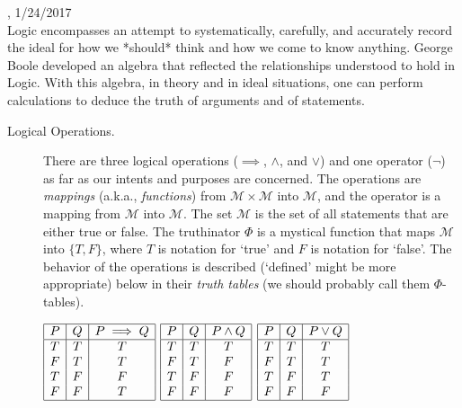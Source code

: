 \documentclass[10pt, AMS Euler]{article}
\begin{document}
, 1/24/2017\\

 Logic encompasses an attempt to systematically, carefully, and accurately record the ideal for 
how we *should* think and how we come to know anything.  George Boole developed an algebra that reflected the 
relationships understood to hold in Logic.  With this algebra, in theory and in ideal situations, one can perform 
calculations to deduce the truth of arguments and of statements.\\




\begin{description}

\item[Logical Operations.]  There are three logical operations ($\implies$, $\wedge$, and $\vee$) and one operator ($\neg$) 
as far as our intents and purposes are concerned.  The operations are \emph{mappings} (a.k.a., \emph{functions}) 
from $\mathcal{M} \times \mathcal{M}$ into $\mathcal{M}$, and the operator is a mapping from $\mathcal{M}$ into $\mathcal{M}$.
The set $\mathcal{M}$ is the set of all statements that are either true or false.  The truthinator $\Phi$ is a mystical function 
that maps $\mathcal{M}$ into $\{T,F\}$, where $T$ is notation for `true' and $F$ is notation for `false'.  
The behavior of the operations is described (`defined' might be more appropriate) below in their \emph{truth tables} (we should probably 
call them $\Phi$-tables).

\begin{center}
$\begin{array}{|c|c|c|} \hline P & Q & P \implies Q \\
\hline
T & T & T \\
F & T & T  \\
T & F & F   \\
F & F & T \\\hline
\end{array}$
\hspace{0.5in} 
$\begin{array}{|c|c|c|} \hline P & Q & P \wedge Q \\
\hline
T & T & T \\
F & T & F  \\
T & F & F   \\
F & F & F \\\hline
\end{array}$ 
\hspace{0.5in} 
$\begin{array}{|c|c|c|} \hline P & Q & P \vee Q \\
\hline
T & T & T \\
F & T & T  \\
T & F & T   \\
F & F & F \\\hline
\end{array}$
\end{center}


\end{description}
\end{document}
